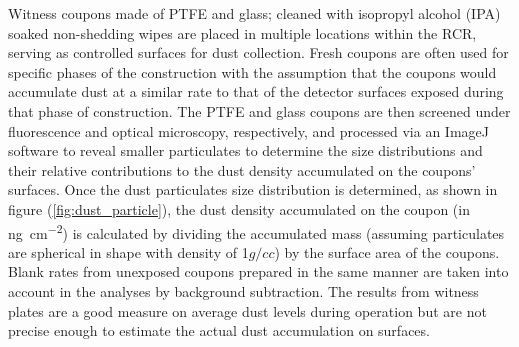 Witness coupons made of PTFE and glass; cleaned with isopropyl alcohol (IPA) soaked non-shedding wipes are placed in multiple locations within the RCR, serving as controlled surfaces for dust collection. Fresh coupons are often used for specific phases of the construction with the assumption that the coupons would accumulate dust at a similar rate to that of the detector surfaces exposed during that phase of construction. The PTFE and glass coupons are then screened under fluorescence and optical microscopy, respectively, and processed via an ImageJ software \cite{DBLP:journals/corr/RuedenSHDWE17} to reveal smaller particulates to determine the size distributions and their relative contributions to the dust density accumulated on the coupons' surfaces. Once the dust particulates size distribution is determined, as shown in figure (\ref{fig:dust_particle}), the dust density accumulated on the coupon (in \si{\nano\g\per\cm\squared}) is calculated by dividing the accumulated mass (assuming particulates are spherical in shape with density of 1${g/cc}$) by the surface area of the coupons. Blank rates from unexposed coupons prepared in the same manner are taken into account in the analyses by background subtraction. The results from witness plates are a good measure on average dust levels during operation but are not precise enough to estimate the actual dust accumulation on surfaces.
%
